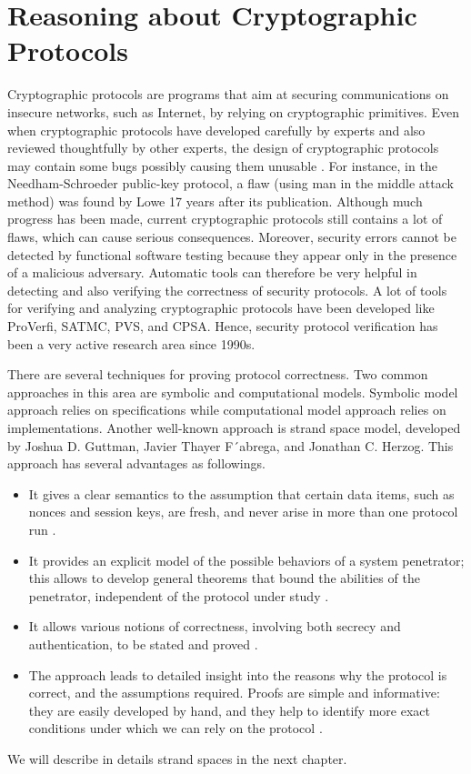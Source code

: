 \section {Reasoning about Cryptographic Protocols}
Cryptographic protocols are programs that aim at securing communications on insecure networks, such as Internet, by relying on cryptographic primitives. Even when cryptographic protocols have developed carefully by experts and also reviewed thoughtfully by other experts, the design of cryptographic protocols may contain some bugs possibly causing them unusable \cite{thayer1998strand}. For instance, in the Needham-Schroeder public-key protocol, a flaw (using man in the middle attack method) was found by Lowe 17 years after its publication. Although much progress has been made, current cryptographic protocols still contains a lot of flaws, which can cause serious consequences. Moreover, security errors cannot be detected by functional software testing because they appear only in the presence of a malicious adversary. Automatic tools can therefore be very helpful in detecting and also verifying the correctness of security protocols.  A lot of tools for verifying and analyzing cryptographic protocols have been developed like ProVerfi, SATMC, PVS, and CPSA. Hence, security protocol verification has been a very active research area since 1990s.

There are several techniques for proving protocol correctness. Two common approaches in this area are symbolic and computational models. Symbolic model approach relies on specifications while computational model approach relies on implementations. Another well-known approach is strand space model, developed by Joshua D. Guttman, Javier Thayer F´abrega, and Jonathan C. Herzog. This approach has several advantages as followings. 
\begin{itemize}
\item It gives a clear semantics to the assumption that certain data
items, such as nonces and session keys, are fresh, and never arise in more
than one protocol run \cite{ss}.
\item It provides an explicit model of the possible behaviors of a system
penetrator; this allows to develop general theorems that bound the
abilities of the penetrator, independent of the protocol under study \cite{ss}.
\item It allows various notions of correctness, involving both secrecy
and authentication, to be stated and proved \cite{ss}.
\item The approach leads to detailed insight into the reasons why
the protocol is correct, and the assumptions required. Proofs are simple
and informative: they are easily developed by hand, and they help to
identify more exact conditions under which we can rely on the protocol
\cite{ss}.
\end{itemize} 
We will describe in details strand spaces in the next chapter. %
 
